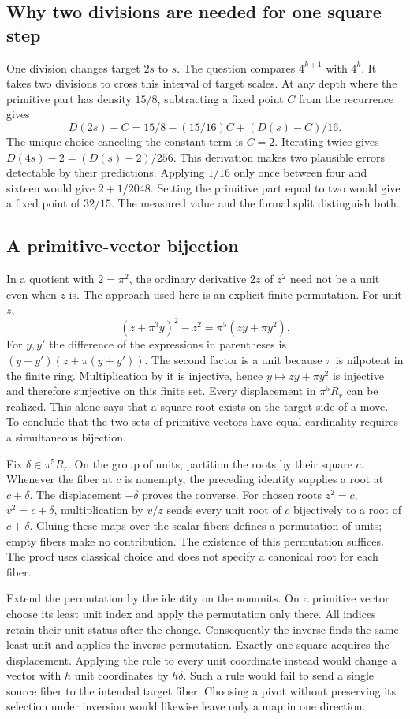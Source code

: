 \documentclass[12pt,letterpaper]{article}
\begin{document}
\subsection{Why two divisions are needed for one square step}
One division changes target $2s$ to $s$. The question compares $4^{k+1}$ with $4^k$. It takes two divisions to cross this interval of target scales. At any depth where the primitive part has density $15/8$, subtracting a fixed point $C$ from the recurrence gives
\[
       D(2s)-C = 15/8-(15/16)C + (D(s)-C)/16.
\]
The unique choice canceling the constant term is $C=2$. Iterating twice gives $D(4s)-2=(D(s)-2)/256$. This derivation makes two plausible errors detectable by their predictions. Applying $1/16$ only once between four and sixteen would give $2+1/2048$. Setting the primitive part equal to two would give a fixed point of $32/15$. The measured value and the formal split distinguish both.

\subsection{A primitive-vector bijection}
In a quotient with $2=\pi^2$, the ordinary derivative $2z$ of $z^2$ need not be a unit even when $z$ is. The approach used here is an explicit finite permutation. For unit $z$,
\[
       (z+\pi^3y)^2-z^2=\pi^5(zy+\pi y^2).
\]
For $y,y'$ the difference of the expressions in parentheses is $(y-y')(z+\pi(y+y'))$. The second factor is a unit because $\pi$ is nilpotent in the finite ring. Multiplication by it is injective, hence $y\mapsto zy+\pi y^2$ is injective and therefore surjective on this finite set. Every displacement in $\pi^5R_r$ can be realized. This alone says that a square root exists on the target side of a move. To conclude that the two sets of primitive vectors have equal cardinality requires a simultaneous bijection.

Fix $\delta\in\pi^5R_r$. On the group of units, partition the roots by their square $c$. Whenever the fiber at $c$ is nonempty, the preceding identity supplies a root at $c+\delta$. The displacement $-\delta$ proves the converse. For chosen roots $z^2=c$, $v^2=c+\delta$, multiplication by $v/z$ sends every unit root of $c$ bijectively to a root of $c+\delta$. Gluing these maps over the scalar fibers defines a permutation of units; empty fibers make no contribution. The existence of this permutation suffices. The proof uses classical choice and does not specify a canonical root for each fiber.

Extend the permutation by the identity on the nonunits. On a primitive vector choose its least unit index and apply the permutation only there. All indices retain their unit status after the change. Consequently the inverse finds the same least unit and applies the inverse permutation. Exactly one square acquires the displacement. Applying the rule to every unit coordinate instead would change a vector with $h$ unit coordinates by $h\delta$. Such a rule would fail to send a single source fiber to the intended target fiber. Choosing a pivot without preserving its selection under inversion would likewise leave only a map in one direction.
\end{document}
